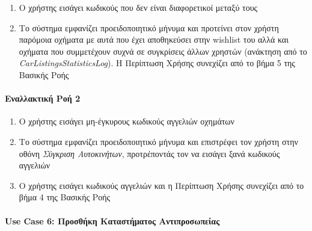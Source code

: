 \documentclass{../ol-softwaremanual}
\begin{document}
	\begin{enumerate}
		\item Ο χρήστης εισάγει κωδικούς που δεν είναι διαφορετικοί μεταξύ τους
		\item Το σύστημα εμφανίζει προειδοποιητικό μήνυμα και προτείνει στον χρήστη παρόμοια οχήματα με αυτά που έχει αποθηκεύσει στην \en wishlist \gr του αλλά και οχήματα που συμμετέχουν συχνά σε συγκρίσεις άλλων χρηστών (ανάκτηση από το \en \textit{CarListingsStatisticsLog}\gr). Η Περίπτωση Χρήσης συνεχίζει από το βήμα 5 της Βασικής Ροής
	\end{enumerate}
	
	\paragraph{Εναλλακτική Ροή 2}
	\begin{enumerate}
		\item Ο χρήστης εισάγει μη-έγκυρους κωδικούς αγγελιών οχημάτων
		\item Το σύστημα εμφανίζει προειδοποιητικό μήνυμα και επιστρέφει τον χρήστη στην οθόνη \textit{Σύγκριση Αυτοκινήτων}, προτρέποντάς τον να εισάγει ξανά κωδικούς αγγελιών
		\item Ο χρήστης εισάγει κωδικούς αγγελιών και η Περίπτωση Χρήσης συνεχίζει από το βήμα 4 της Βασικής Ροής		
	\end{enumerate}
	
	
	\paragraph{\en Use Case 6: \gr Προσθήκη Καταστήματος Αντιπροσωπείας}
	
\end{document}
